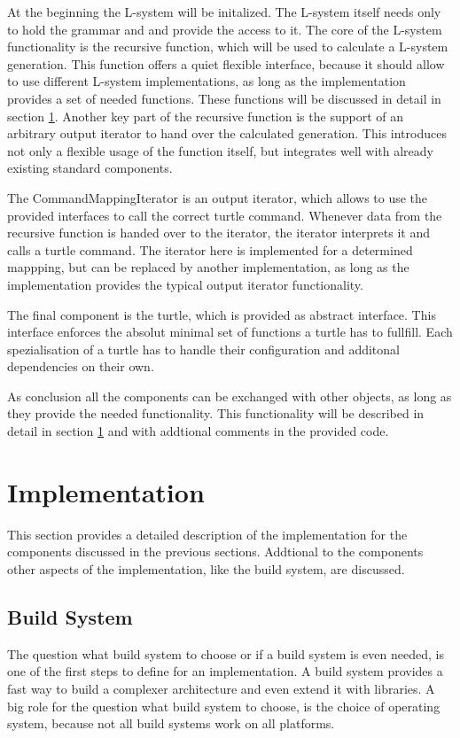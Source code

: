 \documentclass[english]{cpp-hmwk}
\begin{document}
At the beginning the L-system will be initalized. The L-system itself needs only to hold the grammar and and provide the access to it. The core of the L-system functionality is the recursive function, which will be used to calculate a L-system generation. This function offers a quiet flexible interface, because it should allow to use different L-system implementations, as long as the implementation provides a set of needed functions. These functions will be discussed in detail in section \ref{section:impl}. 
Another key part of the recursive function is the support of an arbitrary output iterator to hand over the calculated generation. This introduces not only a flexible usage of the function itself, but integrates well with already existing standard components. 

The CommandMappingIterator is an output iterator, which allows to use the provided interfaces to call the correct turtle command. Whenever data from the recursive function is handed over  to the iterator, the iterator interprets it and calls a turtle command. The iterator here is  implemented for a determined mappping, but can be replaced by another implementation, as long as the implementation provides the typical output iterator functionality.

The final component is the turtle, which is provided as abstract interface. This interface enforces the absolut minimal set of functions a turtle has to fullfill. Each spezialisation of a turtle has to handle their configuration and additonal dependencies on their own.

As conclusion all the components can be exchanged with other objects, as long as they provide the needed functionality. This functionality will be described in detail in section \ref{section:impl} and with addtional comments in the provided code.

\clearpage

\section{Implementation}
\label{section:impl}
This section provides a detailed description of the implementation for the components discussed in the previous sections. Addtional to the components other aspects of the implementation, like the build system, are discussed.

\subsection{Build System}
\label{section:buildsystem}
The question what build system to choose or if a build system is even needed, is one of the first steps to define for an implementation. A build system provides a fast way to build a complexer architecture and even extend it with libraries. A big role for the question what build system to choose, is the choice of operating system, because not all build systems work on all platforms.
 
\end{document}
